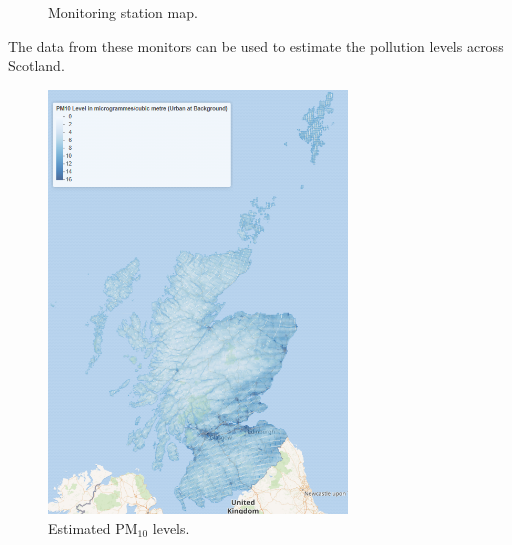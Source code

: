 \documentclass[
  letterpaper,
  DIV=11,
  numbers=noendperiod]{scrartcl}
\begin{document}
\begin{tcolorbox}
\begin{figure}[H]
{}

\caption{Monitoring station map.}

\end{figure}%

The data from these monitors can be used to estimate the pollution
levels across Scotland.

\begin{figure}[H]

{\centering \includegraphics[width=3.125in,height=\textheight]{images/Result-PM10.png}

}

\caption{Estimated PM\(_{10}\) levels.}

\end{figure}%

\end{tcolorbox}
\end{document}
